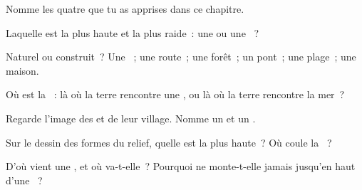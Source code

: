 \begin{exercise}[$\star$]\label{exo:g1:landscapes-around-us:1}
Nomme les quatre  que tu as apprises dans ce chapitre.
\end{exercise}

\begin{exercise}[$\star$]\label{exo:g1:landscapes-around-us:2}
Laquelle est la plus haute et la plus raide~: une  ou une ~?
\end{exercise}

\begin{exercise}[$\star$]\label{exo:g1:landscapes-around-us:3}
Naturel ou construit~? Une ~; une route~; une forêt~; un pont~; une plage~; une maison.
\end{exercise}

\begin{exercise}[$\star$]\label{exo:g1:landscapes-around-us:4}
Où est la ~: là où la terre rencontre une , ou là où la terre
rencontre la mer~?
\end{exercise}

\begin{exercise}[$\star$]\label{exo:g1:landscapes-around-us:5}
Regarde l'image des  et de leur village. Nomme un 
et un .
\end{exercise}

\begin{exercise}[$\star$]\label{exo:g1:landscapes-around-us:6}
Sur le dessin des formes du relief, quelle  est la plus
haute~? Où coule la ~?
\end{exercise}

\begin{exercise}[$\star\star$]\label{exo:g1:landscapes-around-us:7}
D'où vient une , et où va-t-elle~? Pourquoi ne monte-t-elle jamais
jusqu'en haut d'une ~?
\end{exercise}

